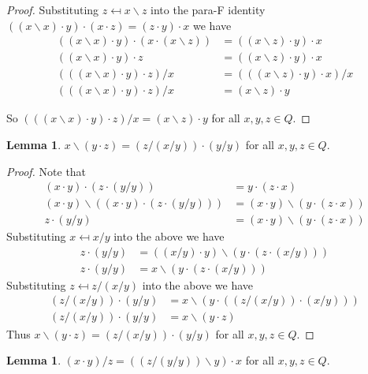 \documentclass[12pt, twoside, openright]{report}
\theoremstyle{definition}
\newtheorem{lem}[thm]{Lemma}
\newcommand{\ldv}{\backslash}       %
\begin{document}
\begin{proof}
  Substituting $z \mapsfrom x\ldv z$ into the para-F identity
    $((x\ldv x)\cdot y)\cdot(x\cdot z) = (z\cdot y)\cdot x$ we have
  \begin{align*}
    ((x\ldv x)\cdot y)\cdot (x\cdot (x\ldv z)) &= ((x\ldv z)\cdot y)\cdot x\\
    ((x\ldv x)\cdot y)\cdot z &= ((x\ldv z)\cdot y)\cdot x\\
    (((x\ldv x)\cdot y)\cdot z)/x &= (((x\ldv z)\cdot y)\cdot x)/x\\
    (((x\ldv x)\cdot y)\cdot z)/x &= (x\ldv z)\cdot y
  \end{align*}

  So $(((x\ldv x)\cdot y)\cdot z)/x = (x\ldv z)\cdot y$ for all $x, y, z\in Q$.
\end{proof}

\begin{lem}\label{M-25}
  $x\ldv(y\cdot z) = (z/(x/y))\cdot(y/y)$ for all $x, y, z\in Q$.
\end{lem}

\begin{proof}
  Note that
  \begin{align*}
    (x\cdot y)\cdot(z\cdot(y/y)) &= y\cdot (z\cdot x)\\
    (x\cdot y)\ldv ((x\cdot y)\cdot(z\cdot(y/y))) &= (x\cdot y)\ldv(y\cdot (z\cdot x))\\
    z\cdot (y/y) &= (x\cdot y)\ldv(y\cdot (z\cdot x))
  \end{align*}
  Substituting $x \mapsfrom x/y$ into the above we have
  \begin{align*}
    z\cdot(y/y) &= ((x/y)\cdot y)\ldv (y\cdot (z\cdot (x/y)))\\
    z\cdot (y/y) &= x\ldv (y\cdot (z\cdot (x/y)))
  \end{align*}
  Substituting $z \mapsfrom z/(x/y)$ into the above we have
  \begin{align*}
    (z/(x/y))\cdot(y/y) &= x\ldv(y\cdot ((z/(x/y))\cdot (x/y)))\\
    (z/(x/y))\cdot(y/y) &= x\ldv(y\cdot z)
  \end{align*}
  Thus $x\ldv(y\cdot z) = (z/(x/y))\cdot (y/y)$ for all $x, y, z\in Q$.
\end{proof}

\begin{lem}\label{M-27}
  $(x\cdot y)/z = ((z/(y/y))\ldv y)\cdot x$ for all $x, y, z\in Q$.
\end{lem}
\end{document}
